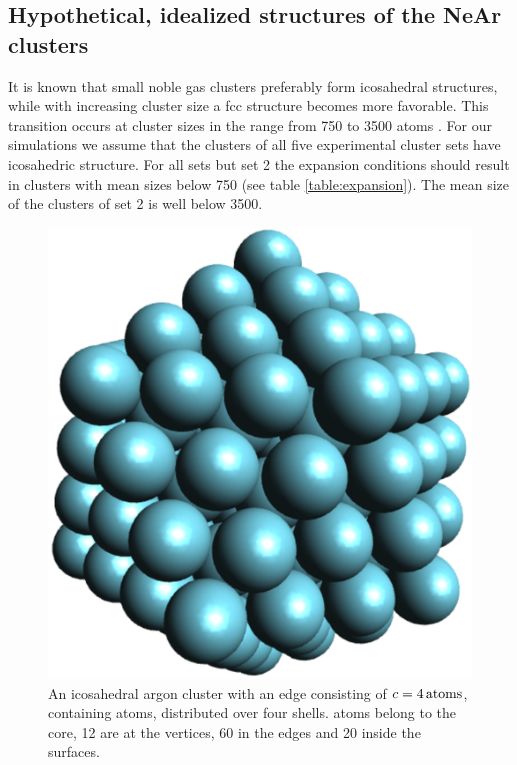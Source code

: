 \subsection{Hypothetical, idealized structures of the NeAr clusters}

It is known that small noble gas clusters preferably form icosahedral structures,
while with increasing cluster size a fcc structure becomes more favorable. This transition
occurs at cluster sizes in the range from 750 to 3500 atoms \cite{Martin96,Doye97,Hartke02}.
For our simulations we assume that the clusters of all five experimental cluster sets have 
icosahedric structure. For all sets but set 2 the expansion conditions should result in clusters 
with mean sizes below 750 (see table \ref{table:expansion}). The mean size of the clusters of set 2 is well below 3500.

\begin{figure}[!ht]
 \centering
 \includegraphics[scale=0.5]{pics/Ar_pure.eps}                        
 \caption{An icosahedral argon cluster with an edge consisting of 
          $c=\unit[4]{atoms}$, containing \unit[147]{atoms},
          distributed over four shells. \unit[55]{atoms} belong
          to the core, 12 are at the vertices, 60 in the edges and 20 inside the
          surfaces.}
 \label{figure:Ar_pure}
\end{figure}    

